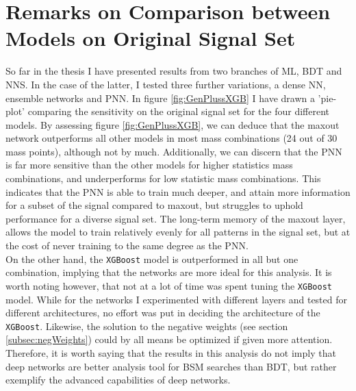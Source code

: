 \section{Remarks on Comparison between Models on Original Signal Set}
So far in the thesis I have presented results from two branches of \ac{ML}, \acf{BDT} and \acf{NNS}. In the case of the latter, I tested
three further variations, a dense \ac{NN}, ensemble networks and \ac{PNN}. In figure \ref{fig:GenPlussXGB} I have drawn a 'pie-plot' comparing 
the sensitivity on the original signal set for the four different models. By assessing figure \ref{fig:GenPlussXGB}, we can deduce that the 
maxout network outperforms all other models in most mass combinations (24 out of 30 mass points), although not by much. Additionally, we can discern 
that the \ac{PNN} is far more sensitive than the other models for higher statistics mass combinations, and underperforms for low statistic mass combinations.
This indicates that the \ac{PNN} is able to train much deeper, and attain more information for a subset of the signal compared to maxout, but struggles to uphold 
performance for a diverse signal set. The long-term memory of the maxout layer, allows the model to train relatively evenly for all patterns in the signal set, but 
at the cost of never training to the same degree as the \ac{PNN}.
\\
On the other hand, the \verb!XGBoost! model is outperformed in all but one combination, implying that the networks are more ideal for this analysis. 
It is worth noting however, that not at a lot of time was spent tuning the \verb!XGBoost! model. While for the networks I experimented with different layers and 
tested for different architectures, no effort was put in deciding the architecture of the \verb!XGBoost!. Likewise, the solution to the negative weights (see 
section \ref{subsec:negWeights}) could by all means be optimized if given more attention. Therefore, it is worth saying that the results in this analysis
do not imply that deep networks are better analysis tool for \ac{BSM} searches than \ac{BDT}, but rather exemplify the advanced capabilities of deep networks.
